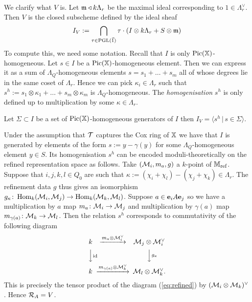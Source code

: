 \documentclass[12pt]{amsart}
\begin{document}
We clarify what $V$ is. 
Let $\mathfrak{m}\triangleleft k\Lambda_r$ be the maximal ideal corresponding to $1 \in \Lambda_r^\vee$. 
Then $V$ is the closed subscheme defined by the ideal sheaf
$$ I_V := \bigcap_{\tau \in \operatorname{PGL}(\vec{1})} \tau\cdot\left(I \otimes k\Lambda_r + S \otimes \mathfrak{m} \right)$$
To compute this, we need some notation. 
Recall that $I$ is only $\operatorname{Pic}(\mathbb{X})$-homogeneous. Let $s \in I$ be a $\operatorname{Pic}(\mathbb{X})$-homogeneous element. 
Then we can express it as a sum of $\Lambda_Q$-homogeneous elements $s = s_1 + \ldots + s_m$ all of whose degrees lie in the same coset of $\Lambda_r$. 
Hence we can pick $\kappa_i \in \Lambda_r$ such that $s^h := s_1 \otimes \kappa_1 + \ldots + s_m \otimes \kappa_m$ is $\Lambda_Q$-homogeneous. 
The {\em homogenisation} $s^h$ is only defined up to multiplication by some $\kappa \in \Lambda_r$. 

\begin{lemma}
Let $\Sigma \subset I$ be a set of $\operatorname{Pic}(\mathbb{X})$-homogeneous generators of $I$ then $I_V = \langle s^h \,|\, s \in \Sigma \rangle.$ 
\end{lemma}

Under the assumption that $\mathcal{T}$ captures the Cox ring of $\mathbb{X}$ we have that $I$ is generated by elements of the form $s:= y - \gamma (y)$ for some $\Lambda_Q$-homogeneous element $y \in S$.
Its homogenisation $s^h$ can be encoded moduli-theoretically on the refined representation space as follows.
Take $(\mathcal{M}_i, m_a, g)$ a $k$-point of $\mathbb{M}_\text{ref}$.
Suppose that $i,j,k,l \in Q_0$ are such that $\kappa:= (\chi_i + \chi_l)-(\chi_j + \chi_k) \in \Lambda_r$. 
The refinement data $g$ thus gives an isomorphism $g_{\kappa} \colon \operatorname{Hom}_k(\mathcal{M}_i,\mathcal{M}_j) \to \operatorname{Hom}_k(\mathcal{M}_k,\mathcal{M}_l)$. 
Suppose $a \in \mathbf{e}_i A \mathbf{e}_j$ so we have a  multiplication by $a$ map $m_a \colon \mathcal{M}_i \to \mathcal{M}_j$ and multiplication by $\gamma(a)$ map $m_{\gamma(a)} \colon  \mathcal{M}_{k} \to \mathcal{M}_{l}$. Then the relation $s^h$ corresponds to commutativity of the following diagram 
\begin{equation}
\begin{CD}
k @>m_a \otimes \cM_{i}^\vee>> \cM_{j} \otimes \cM_{i}^\vee\\
@VV\text{id}V @VV{g_\kappa}V\\
k @>m_{\gamma(a)}\otimes \cM_{k}^\vee>> \cM_{l} \otimes \cM_{k}^\vee.
\end{CD}
\end{equation}
This is precisely the tensor product of the diagram (\ref{eq:refined}) by $(\mathcal{M}_i \otimes \mathcal{M}_k)^\vee$.
Hence $\mathcal{R}_A = V$.
\end{document}
